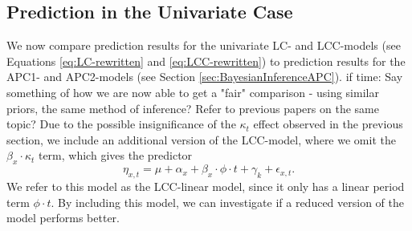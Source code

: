 

\subsection{Prediction in the Univariate Case}
\label{sec:uv-pred}
We now compare prediction results for the univariate LC- and LCC-models (see Equations \ref{eq:LC-rewritten} and \ref{eq:LCC-rewritten}) to prediction results for the APC1- and APC2-models (see Section \ref{sec:BayesianInferenceAPC}).
\textcolor{myDarkGreen}{if time: Say something of how we are now able to get a "fair" comparison - using similar priors, the same method of inference? Refer to previous papers on the same topic? }
Due to the possible insignificance of the $\kappa_t$ effect observed in the previous section, we include an additional version of the LCC-model, where we omit the $\beta_x\cdot \kappa_t$ term, which gives the predictor
\begin{equation}
    \eta_{x,t} = \mu + \alpha_x + \beta_x\cdot \phi \cdot t + \gamma_k + \epsilon_{x,t}.
\end{equation}
We refer to this model as the LCC-linear model, since it only has a linear period term $\phi \cdot t$. By including this model, we can investigate if a reduced version of the model performs better. 

